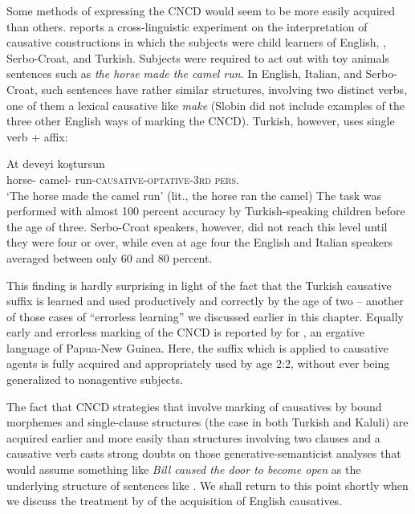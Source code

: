 Some methods of expressing the CNCD would seem to be more easily acquired than others. \citet{Slobin1978} reports a cross-linguistic experiment on the interpretation of causative constructions in which the subjects were child learners of English, , Serbo-Croat, and Turkish. Subjects were required to act out with toy animals sentences such as \textit{the horse made the camel run}. In English, Italian, and Serbo-Croat, such sentences have rather similar structures, involving two distinct verbs, one of them a lexical causative like \textit{make} (Slobin did not
include examples of the three other English ways of marking the CNCD). Turkish, however, uses single verb + affix:

\ea\label{ex:3:76}
\gll At deveyi koştursun\\
{horse-\NOM} {camel-\ACC} {run-\textsc{causative-optative-3rd pers.}}\\
\glt `The horse made the camel run' (lit., the horse ran the camel)
\z
The task was performed with almost 100 percent accuracy by Turkish-speaking children before the age of three. Serbo-Croat speakers, however, did not reach this level until they were four or over, while even at age four the English and Italian speakers averaged between only 60 and 80 percent.

This finding is hardly surprising in light of the fact that the Turkish causative suffix is learned and used productively and correctly by the age of two -- another of those cases of ``errorless learning'' we discussed earlier in this chapter. Equally early and errorless marking of the CNCD is reported by \citet{Schiefflin1979} for , an ergative language of Papua-New Guinea. Here, the suffix which is applied to causative agents is fully acquired and appropriately used by age 2:2, without ever being generalized to nonagentive subjects.

The fact that CNCD strategies that involve marking of causatives by bound morphemes and single-clause structures (the case in both Turkish and Kaluli) are acquired earlier and more easily than struc\-tures involving two clauses and a causative verb casts strong doubts on those generative-semanticist analyses that would assume something like \textit{Bill caused the door to become open} as the underlying structure of sentences like . We shall return to this point shortly when we discuss the treatment by \citet{Bowerman1974} of the acquisition of English causatives.

